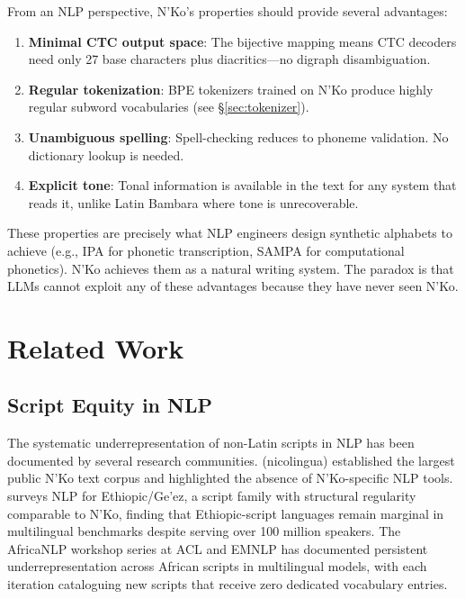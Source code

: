 \documentclass[11pt]{article}
\begin{document}
From an NLP perspective, N'Ko's properties should provide several advantages:
\begin{enumerate}
\item \textbf{Minimal CTC output space}: The bijective mapping means CTC decoders need only 27 base characters plus diacritics---no digraph disambiguation.
\item \textbf{Regular tokenization}: BPE tokenizers trained on N'Ko produce highly regular subword vocabularies (see \S\ref{sec:tokenizer}).
\item \textbf{Unambiguous spelling}: Spell-checking reduces to phoneme validation. No dictionary lookup is needed.
\item \textbf{Explicit tone}: Tonal information is available in the text for any system that reads it, unlike Latin Bambara where tone is unrecoverable.
\end{enumerate}

These properties are precisely what NLP engineers design synthetic alphabets to achieve (e.g., IPA for phonetic transcription, SAMPA for computational phonetics).
N'Ko achieves them as a natural writing system.
The paradox is that LLMs cannot exploit any of these advantages because they have never seen N'Ko.

\section{Related Work}

\subsection{Script Equity in NLP}

The systematic underrepresentation of non-Latin scripts in NLP has been documented by several research communities.
\citet{doumbouya2021} (nicolingua) established the largest public N'Ko text corpus and highlighted the absence of N'Ko-specific NLP tools.
\citet{tonja2023natural} surveys NLP for Ethiopic/Ge'ez, a script family with structural regularity comparable to N'Ko, finding that Ethiopic-script languages remain marginal in multilingual benchmarks despite serving over 100 million speakers.
The AfricaNLP workshop series at ACL and EMNLP has documented persistent underrepresentation across African scripts in multilingual models, with each iteration cataloguing new scripts that receive zero dedicated vocabulary entries.
\end{document}
